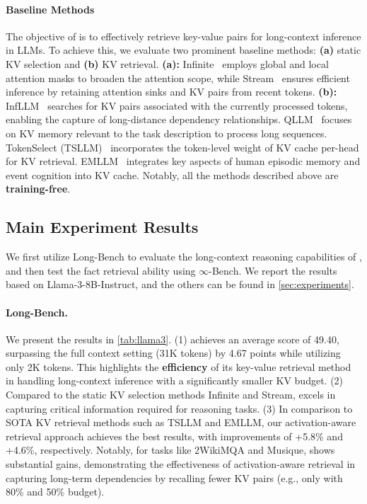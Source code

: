 \paragraph{Baseline Methods} The objective of \name is to effectively retrieve key-value pairs for long-context inference in LLMs. To achieve this, we evaluate two prominent baseline methods: \textbf{(a)} static KV selection and \textbf{(b)} KV retrieval. \textbf{(a):} Infinite~\cite{infinite-llm} employs global and local attention masks to broaden the attention scope, while Stream~\cite{stream-llm} ensures efficient inference by retaining attention sinks and KV pairs from recent tokens. \textbf{(b):} InfLLM~\cite{stream-llm} searches for KV pairs associated with the currently processed tokens, enabling the capture of long-distance dependency relationships. QLLM~\cite{qllm} focuses on KV memory relevant to the task description to process long sequences.  TokenSelect (TSLLM)~\cite{tokenselect} incorporates the token-level weight of  KV cache per-head for KV retrieval. EMLLM~\cite{emllm} integrates key aspects of human episodic memory and event cognition into KV cache. Notably, all the methods described above are \textbf{training-free}.


\subsection{Main Experiment Results}
\label{sec:results}

We first utilize Long-Bench to evaluate the long-context reasoning capabilities of \name, and then test the fact retrieval ability using $\infty$-Bench.
{We report the results based on Llama-3-8B-Instruct, and the others can be found in \cref{sec:experiments}.}


\paragraph{Long-Bench.} We present the results in \cref{tab:llama3}. (1) \name achieves an average score of 49.40, surpassing the full context setting (31K tokens) by 4.67 points while utilizing only 2K tokens. This highlights the \textbf{efficiency} of its key-value retrieval method in handling long-context inference with a significantly smaller KV budget. (2) Compared to the static KV selection methods Infinite and Stream, \name excels in capturing critical information required for reasoning tasks. (3) In comparison to SOTA KV retrieval methods such as TSLLM and EMLLM, our activation-aware retrieval approach achieves the best results, with improvements of +5.8\% and +4.6\%, respectively. Notably, for tasks like 2WikiMQA and Musique, \name shows substantial gains, demonstrating the effectiveness of activation-aware retrieval in capturing long-term dependencies by recalling fewer KV pairs (e.g., only with 80\% and 50\% budget).

